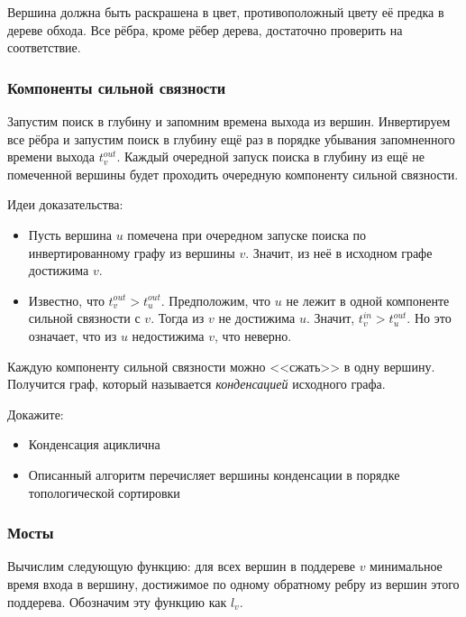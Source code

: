 \documentclass[a4paper,12pt]{article}
\begin{document}
      Вершина должна быть раскрашена в цвет, противоположный цвету
      её предка в дереве обхода. Все рёбра, кроме рёбер дерева,
      достаточно проверить на соответствие.

      \subsubsection{Компоненты сильной связности}

      Запустим поиск в глубину и запомним времена выхода из вершин.
      Инвертируем все рёбра и запустим поиск в глубину ещё раз
      в порядке убывания запомненного времени выхода $t^{out}_v$.
      Каждый очередной запуск поиска в глубину из ещё не помеченной
      вершины будет проходить очередную компоненту сильной связности.

      Идеи доказательства:
      \begin{itemize}
        \item Пусть вершина $u$ помечена при очередном запуске поиска
          по инвертированному графу из вершины $v$.
          Значит, из неё в исходном графе достижима $v$.
        \item Известно, что $t^{out}_v > t^{out}_u$.
          Предположим, что $u$ не лежит в одной компоненте сильной
          связности с $v$. Тогда из $v$ не достижима $u$. Значит,
          $t^{in}_v > t^{out}_u$. Но это означает, что из $u$
          недостижима $v$, что неверно.
      \end{itemize}

      Каждую компоненту сильной связности можно <<сжать>> в одну
      вершину. Получится граф, который называется
      \emph{конденсацией} исходного графа.
      
      Докажите:
      \begin{itemize}
        \item Конденсация ациклична
        \item Описанный алгоритм перечисляет вершины конденсации
          в порядке топологической сортировки
      \end{itemize}

      \subsubsection{Мосты}

      Вычислим следующую функцию: для всех вершин в поддереве $v$
      минимальное время входа в вершину, достижимое по одному
      обратному ребру из вершин этого поддерева. Обозначим эту
      функцию как $l_v$.
\end{document}
